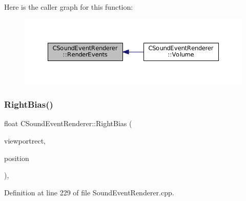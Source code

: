 Here is the caller graph for this function\+:
\nopagebreak
\begin{figure}[H]
\begin{center}
\leavevmode
\includegraphics[width=350pt]{classCSoundEventRenderer_aa8b0c3029ea920ae4f4a08b9d9dd1c9c_icgraph}
\end{center}
\end{figure}
\hypertarget{classCSoundEventRenderer_a4be5ff09785c55c3b5b6966fb41eb47f}{}\label{classCSoundEventRenderer_a4be5ff09785c55c3b5b6966fb41eb47f} 
\subsubsection{\texorpdfstring{Right\+Bias()}{RightBias()}}
{\footnotesize\ttfamily float C\+Sound\+Event\+Renderer\+::\+Right\+Bias (\begin{DoxyParamCaption}\item[{const \hyperlink{structSRectangle}{S\+Rectangle} \&}]{viewportrect,  }\item[{const \hyperlink{classCPosition}{C\+Position} \&}]{position }\end{DoxyParamCaption})\hspace{0.3cm}{\ttfamily [static]}, {\ttfamily [protected]}}



Definition at line 229 of file Sound\+Event\+Renderer.\+cpp.


